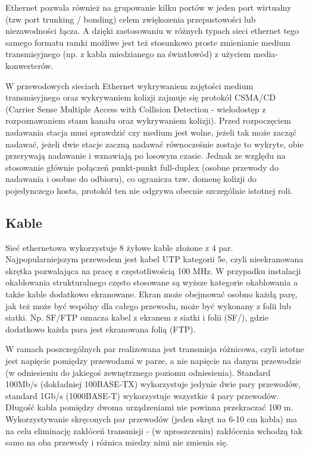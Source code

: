 Ethernet pozwala również na grupowanie kilku portów w jeden port wirtualny (tzw port trunking / bonding) celem zwiększenia przepustowości lub niezawodności łącza. A dzięki zastosowaniu w różnych typach sieci ethernet tego samego formatu ramki możliwe jest też stosunkowo proste zmienianie medium transmisyjnego (np. z kabla miedzianego na światłowód) z użyciem media-konwerterów.

W przewodowych sieciach Ethernet wykrywaniem zajętości medium transmisyjnego oraz wykrywaniem kolizji zajmuje się protokół CSMA/CD (Carrier Sense Multiple Access with Collision Detection - wielodostęp z rozpoznawaniem stanu kanału oraz wykrywaniem kolizji). Przed rozpoczęciem nadawania stacja musi sprawdzić czy medium jest wolne, jeżeli tak może zacząć nadawać, jeżeli dwie stacje zaczną nadawać równocześnie zostaje to wykryte, obie przerywają nadawanie i wznawiają po losowym czasie. Jednak ze względu na stosowanie głównie połączeń punkt-punkt full-duplex (osobne przewody do nadawania i osobne do odbioru), co ogranicza tzw. domenę kolizji do pojedynczego hosta, protokół ten nie odgrywa obecnie szczególnie istotnej roli.

\subsection{Kable}

Sieć ethernetowa wykorzystuje 8 żyłowe kable złożone z 4 par. Najpopularniejszym przewodem jest kabel UTP kategorii 5e, czyli nieekranowana skrętka pozwalająca na pracę z częstotliwością 100 MHz. W przypadku instalacji okablowania strukturalnego często stosowane są wyższe kategorie okablowania a także kable dodatkowo ekranowane. Ekran może obejmować osobno każdą parę, jak też może być wspólny dla całego przewodu, może być wykonany z folii lub siatki. Np. SF/FTP oznacza kabel z ekranem z siatki i folii (SF/), gdzie dodatkowo każda para jest ekranowana folią (FTP).

W ramach poszczególnych par realizowana jest transmisja różnicowa, czyli istotne jest napięcie pomiędzy przewodami w parze, a nie napięcie na danym przewodzie (w odniesieniu do jakiegoś zewnętrznego poziomu odniesienia).
Standard 100Mb/s (dokładniej 100BASE-TX) wykorzystuje jedynie dwie pary przewodów, standard 1Gb/s (1000BASE‑T) wykorzystuje wszystkie 4 pary przewodów.
Długość kabla pomiędzy dwoma urządzeniami nie powinna przekraczać 100 m.
Wykorzystywanie skręconych par przewodów (jeden skręt na 6-10 cm kabla) ma na celu eliminację zakłóceń transmisji - (w uproszczeniu) zakłócenia wchodzą tak samo na oba przewody i różnica miedzy nimi nie zmienia się.

